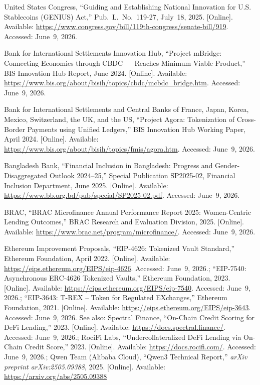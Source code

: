 \documentclass[12pt, a4paper]{report}
\begin{document}
{\begin{enumerate}[label={[\arabic*]}]
\item United States Congress, ``Guiding and Establishing National Innovation for U.S. Stablecoins (GENIUS) Act,'' Pub.~L.~No.~119-27, July~18, 2025. [Online]. Available: \url{https://www.congress.gov/bill/119th-congress/senate-bill/919}. Accessed: June~9, 2026.

\item Bank for International Settlements Innovation Hub, ``Project mBridge: Connecting Economies through CBDC --- Reaches Minimum Viable Product,'' BIS Innovation Hub Report, June 2024. [Online]. Available: \url{https://www.bis.org/about/bisih/topics/cbdc/mcbdc_bridge.htm}. Accessed: June~9, 2026.

\item Bank for International Settlements and Central Banks of France, Japan, Korea, Mexico, Switzerland, the UK, and the US, ``Project Agora: Tokenization of Cross-Border Payments using Unified Ledgers,'' BIS Innovation Hub Working Paper, April 2024. [Online]. Available: \url{https://www.bis.org/about/bisih/topics/fmis/agora.htm}. Accessed: June~9, 2026.

\item Bangladesh Bank, ``Financial Inclusion in Bangladesh: Progress and Gender-Disaggregated Outlook 2024--25,'' Special Publication SP2025-02, Financial Inclusion Department, June 2025. [Online]. Available: \url{https://www.bb.org.bd/pub/special/SP2025-02.pdf}. Accessed: June~9, 2026.

\item BRAC, ``BRAC Microfinance Annual Performance Report 2025: Women-Centric Lending Outcomes,'' BRAC Research and Evaluation Division, 2025. [Online]. Available: \url{https://www.brac.net/program/microfinance/}. Accessed: June~9, 2026.

\item Ethereum Improvement Proposals, ``EIP-4626: Tokenized Vault Standard,'' Ethereum Foundation, April 2022. [Online]. Available: \url{https://eips.ethereum.org/EIPS/eip-4626}. Accessed: June~9, 2026.; ``EIP-7540: Asynchronous ERC-4626 Tokenized Vaults,'' Ethereum Foundation, 2023. [Online]. Available: \url{https://eips.ethereum.org/EIPS/eip-7540}. Accessed: June~9, 2026.; ``EIP-3643: T-REX -- Token for Regulated EXchanges,'' Ethereum Foundation, 2021. [Online]. Available: \url{https://eips.ethereum.org/EIPS/eip-3643}. Accessed: June~9, 2026. See also: Spectral Finance, ``On-Chain Credit Scoring for DeFi Lending,'' 2023. [Online]. Available: \url{https://docs.spectral.finance/}. Accessed: June~9, 2026.; RociFi Labs, ``Undercollateralized DeFi Lending via On-Chain Credit Score,'' 2023. [Online]. Available: \url{https://docs.rocifi.com/}. Accessed: June~9, 2026.; Qwen Team (Alibaba Cloud), ``Qwen3 Technical Report,'' \textit{arXiv preprint arXiv:2505.09388}, 2025. [Online]. Available: \url{https://arxiv.org/abs/2505.09388}


\end{enumerate}}
\end{document}
